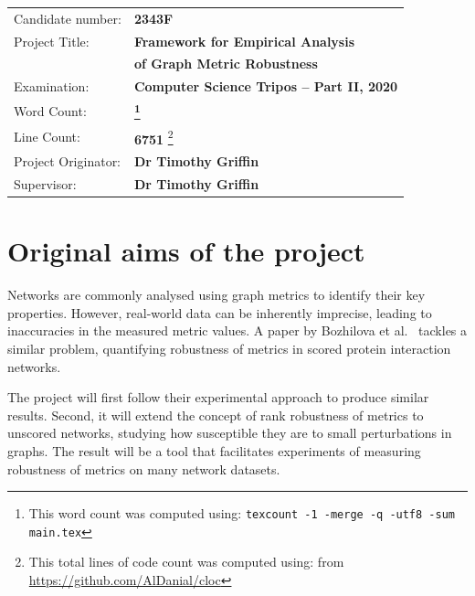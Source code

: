 \documentclass[12pt,a4paper,twoside,openany]{report}
\begin{document}
    {\large
        \begin{savenotes}
            \begin{tabular}{ll}
                Candidate number: & \textbf{2343F}                            \\
                Project Title: & \textbf{Framework for Empirical Analysis} \\ & \textbf{of Graph Metric Robustness}                    \\
                Examination: & \textbf{Computer Science Tripos -- Part II, 2020} \\
                Word Count: & \textbf{\footnote{This word count was computed using: \texttt{texcount -1 -merge -q -utf8 -sum main.tex}}}                                    \\
                Line Count: & \textbf{6751} \footnote{This total lines of code count was computed using:
                    \vspace*{-3.5mm}\hspace*{7mm} from \url{https://github.com/AlDanial/cloc} } \\
                Project Originator: & \textbf{Dr Timothy Griffin}                               \\
                Supervisor: & \textbf{Dr Timothy Griffin}                                        \\
            \end{tabular}
        \end{savenotes}
    }

    \section*{Original aims of the project}

    Networks are commonly analysed using graph metrics to identify their key properties.
    However, real-world data can be inherently imprecise, leading to inaccuracies in the measured metric values.
    A paper by Bozhilova et al.~\cite{Bozhilova2019} tackles a similar problem, quantifying robustness of metrics in scored protein interaction networks.

    The project will first follow their experimental approach to produce similar results.
    Second, it will extend the concept of rank robustness of metrics to unscored networks, studying how susceptible they are to small perturbations in graphs.
    The result will be a tool that facilitates experiments of measuring robustness of metrics on many network datasets.
\end{document}

